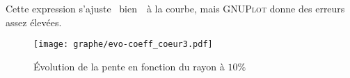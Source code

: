 	Cette expression s'ajuste \og~bien~\fg~à la courbe, mais \textsc{GNUPlot} donne des erreurs
	assez élevées.
	\begin{figure}[hbt!]
		\centering \texttt{[image: graphe/evo-coeff\_coeur3.pdf]}
		\caption{Évolution de la pente en fonction du rayon à $10\%$}
		\label{coeff-coeur2}
	\end{figure}

